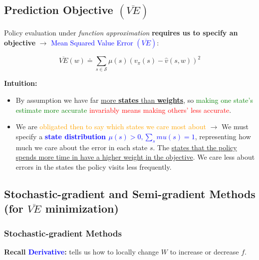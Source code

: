 \documentclass[12pt, a4paper]{article}
\begin{document}
\subsection{Prediction Objective $(\overline{VE})$}\label{prediction-objective}


Policy evaluation under \textit{function approximation} \textbf{requires us to specify an objective} $\rightarrow$ \textcolor{blue}{Mean Squared Value Error $(\overline{VE})$}:

$$
\overline{VE}(w) \doteq \sum_{s \in \mathcal{S}} \mu(s) (v_\pi(s) - \hat{v}(s, w))^2
$$


\textbf{Intuition:}
\begin{itemize}
  \item By assumption we have far \uline{more \textbf{states} than \textbf{weights}}, so \textcolor{Green}{making one state’s estimate more accurate} \textcolor{red}{invariably means making others' less accurate}.
  \item  We are \textcolor{Orange}{obligated then to say which states we care most about} $\rightarrow$ We must specify a \textbf{\textcolor{blue}{state distribution $\mu(s) > 0, \sum_s mu(s) = 1$}}, representing how much we care about the error in each state $s$. The \uline{states that the policy spends more time in have a higher weight in the objective}. We care less about errors in the states the policy visits less frequently.
\end{itemize}











\subsection{Stochastic-gradient and Semi-gradient Methods (for $\overline{VE}$ minimization)}\label{gradient-descent}


\subsubsection{Stochastic-gradient Methods}\label{stochastic-gradient-methods}


\textbf{Recall \textcolor{blue}{Derivative}:} tells us how to locally change $W$ to increase or decrease $f$.
\end{document}
